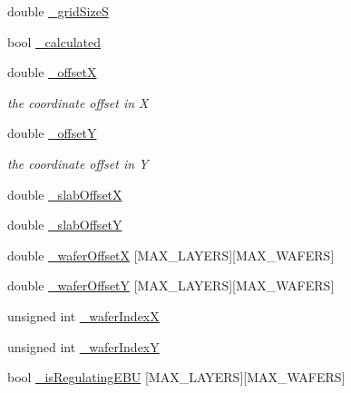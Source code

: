 \begin{DoxyCompactItemize}
double \hyperlink{class_d_d4hep_1_1_d_d_segmentation_1_1_megatile_layer_grid_x_y_a3a86080381739af95c9cb175fc25a5f5}{\_\-gridSizeS}
\item 
bool \hyperlink{class_d_d4hep_1_1_d_d_segmentation_1_1_megatile_layer_grid_x_y_a3330c7077781b90cd4d8a780de205960}{\_\-calculated}
\item 
double \hyperlink{class_d_d4hep_1_1_d_d_segmentation_1_1_megatile_layer_grid_x_y_a70c7ce913e3a2038712e9f46e8a6cfb1}{\_\-offsetX}
\begin{DoxyCompactList}\small\item\em the coordinate offset in X \item\end{DoxyCompactList}\item 
double \hyperlink{class_d_d4hep_1_1_d_d_segmentation_1_1_megatile_layer_grid_x_y_ae20ad9ed770bb9bce72ee3838a6abb59}{\_\-offsetY}
\begin{DoxyCompactList}\small\item\em the coordinate offset in Y \item\end{DoxyCompactList}\item 
double \hyperlink{class_d_d4hep_1_1_d_d_segmentation_1_1_megatile_layer_grid_x_y_a2a958dcddea84e48565a2a42f4ebcf10}{\_\-slabOffsetX}
\item 
double \hyperlink{class_d_d4hep_1_1_d_d_segmentation_1_1_megatile_layer_grid_x_y_a61ef3df26e0b23cef4750bcdb597c88f}{\_\-slabOffsetY}
\item 
double \hyperlink{class_d_d4hep_1_1_d_d_segmentation_1_1_megatile_layer_grid_x_y_a631f3f1389a8cf6f1f83489aa788d558}{\_\-waferOffsetX} \mbox{[}MAX\_\-LAYERS\mbox{]}\mbox{[}MAX\_\-WAFERS\mbox{]}
\item 
double \hyperlink{class_d_d4hep_1_1_d_d_segmentation_1_1_megatile_layer_grid_x_y_aecce12c3e118e5e9176a46395938e8f8}{\_\-waferOffsetY} \mbox{[}MAX\_\-LAYERS\mbox{]}\mbox{[}MAX\_\-WAFERS\mbox{]}
\item 
unsigned int \hyperlink{class_d_d4hep_1_1_d_d_segmentation_1_1_megatile_layer_grid_x_y_ae5d63f80a247fc98ec77fea73d93be60}{\_\-waferIndexX}
\item 
unsigned int \hyperlink{class_d_d4hep_1_1_d_d_segmentation_1_1_megatile_layer_grid_x_y_a42e3bd719291c17dafe836762a6d7f02}{\_\-waferIndexY}
\item 
bool \hyperlink{class_d_d4hep_1_1_d_d_segmentation_1_1_megatile_layer_grid_x_y_a46909b6552b97789492f2b8c97ed8cb6}{\_\-isRegulatingEBU} \mbox{[}MAX\_\-LAYERS\mbox{]}\mbox{[}MAX\_\-WAFERS\mbox{]}

\end{DoxyCompactItemize}
